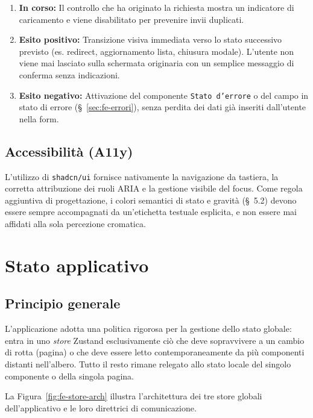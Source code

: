 \documentclass[11pt,a4paper]{article}
\begin{document}
\begin{enumerate}
    \item \textbf{In corso:} Il controllo che ha originato la richiesta mostra un indicatore di caricamento e viene disabilitato per prevenire invii duplicati.
    \item \textbf{Esito positivo:} Transizione visiva immediata verso lo stato successivo previsto (es. redirect, aggiornamento lista, chiusura modale). L'utente non viene mai lasciato sulla schermata originaria con un semplice messaggio di conferma senza indicazioni.
    \item \textbf{Esito negativo:} Attivazione del componente \texttt{Stato d'errore} o del campo in stato di errore (\S~\ref{sec:fe-errori}), senza perdita dei dati già inseriti dall'utente nella form.
\end{enumerate}

\subsection{Accessibilità (A11y)}

L'utilizzo di \texttt{shadcn/ui} fornisce nativamente la navigazione da tastiera, la corretta attribuzione dei ruoli ARIA e la gestione visibile del focus. Come regola aggiuntiva di progettazione, i colori semantici di stato e gravità (\S~5.2) devono essere sempre accompagnati da un'etichetta testuale esplicita, e non essere mai affidati alla sola percezione cromatica.

\section{Stato applicativo}

\subsection{Principio generale}

L'applicazione adotta una politica rigorosa per la gestione dello stato globale: entra in uno \emph{store} Zustand esclusivamente ciò che deve sopravvivere a un cambio di rotta (pagina) o che deve essere letto contemporaneamente da più componenti distanti nell'albero. Tutto il resto rimane relegato allo stato locale del singolo componente o della singola pagina.

La Figura~\ref{fig:fe-store-arch} illustra l'architettura dei tre store globali dell'applicativo e le loro direttrici di comunicazione.
\end{document}
